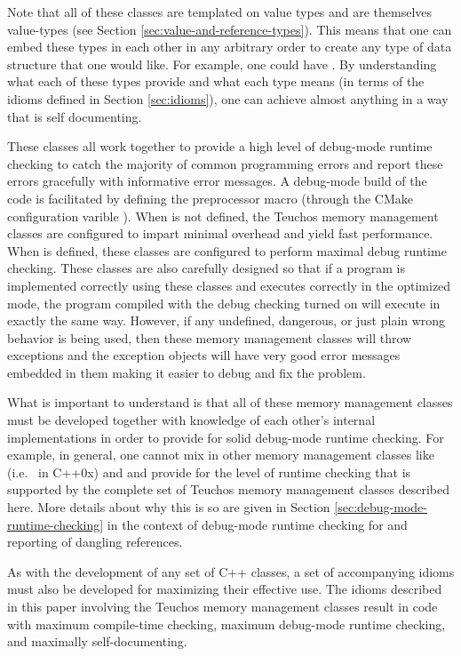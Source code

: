 \documentclass[pdf,ps2pdf,11pt]{SANDreport}
\begin{document}
Note that all of these classes are templated on value types and are
themselves value-types (see Section
{}\ref{sec:value-and-reference-types}).  This means that one can embed
these types in each other in any arbitrary order to create any type of
data structure that one would like.  For example, one could have
{}.  By
understanding what each of these types provide and what each type
means (in terms of the idioms defined in Section {}\ref{sec:idioms}),
one can achieve almost anything in a way that is self documenting.

These classes all work together to provide a high level of debug-mode
runtime checking to catch the majority of common programming errors
and report these errors gracefully with informative error messages.  A
debug-mode build of the code is facilitated by defining the
preprocessor macro {} (through the CMake
configuration varible {}).  When
{} is not defined, the Teuchos memory management
classes are configured to impart minimal overhead and yield fast
performance.  When {} is defined, these classes
are configured to perform maximal debug runtime checking.  These
classes are also carefully designed so that if a program is
implemented correctly using these classes and executes correctly in
the optimized mode, the program compiled with the debug checking
turned on will execute in exactly the same way.  However, if any
undefined, dangerous, or just plain wrong behavior is being used, then
these memory management classes will throw exceptions and the
exception objects will have very good error messages embedded in them
making it easier to debug and fix the problem.

What is important to understand is that all of these memory management
classes must be developed together with knowledge of each other's
internal implementations in order to provide for solid debug-mode
runtime checking.  For example, in general, one cannot mix in other
memory management classes like {} (i.e.\
{} in C++0x) and {} and provide
for the level of runtime checking that is supported by the complete
set of Teuchos memory management classes described here.  More details
about why this is so are given in Section
{}\ref{sec:debug-mode-runtime-checking} in the context of debug-mode
runtime checking for and reporting of dangling references.

As with the development of any set of C++ classes, a set of
accompanying idioms must also be developed for maximizing their
effective use.  The idioms described in this paper involving the
Teuchos memory management classes result in code with maximum
compile-time checking, maximum debug-mode runtime checking, and
maximally self-documenting.
\end{document}

